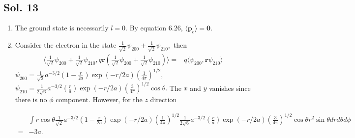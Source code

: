 \subsection*{Sol. 13}
\begin{enumerate}
    \item 
    The ground state is necessarily $l=0.$ By equation 6.26, $\langle \bm p_e\rangle=\bm 0.$
    \item Consider the electron in the state 
    $\frac{1}{\sqrt{2}}\psi_{200} +\frac{1}{\sqrt{2}} \psi_{210},$ then
    \begin{align*}
        \langle
        \frac{1}{\sqrt{2}}\psi_{200} +\frac{1}{\sqrt{2}} \psi_{210},
        q\bm r (\frac{1}{\sqrt{2}}\psi_{200} +\frac{1}{\sqrt{2}} \psi_{210})
        \rangle = & 
        q
        \langle\psi_{200}, \bm r\psi_{210}\rangle
    \end{align*}
    $\psi_{200}=\frac{1}{\sqrt{2}}a^{-3/2}(1-\frac{r}{2a})\exp(-r/2a)(\frac{1}{4\pi})^{1/2},$
    $\psi_{210}=\frac{1}{2\sqrt{6}}a^{-3/2}(\frac{r}{a})\exp(-r/2a)
    (\frac{3}{4\pi})^{1/2}\cos\theta.$
    The $x$ and $y$ vanishes since there is no $\phi$ component. However, for the $z$ direction
    
    \begin{align*}
        &\int
        r\cos\theta 
        \frac{1}{\sqrt{2}}a^{-3/2}(1-\frac{r}{2a})\exp(-r/2a)(\frac{1}{4\pi})^{1/2}
        \frac{1}{2\sqrt{6}}a^{-3/2}(\frac{r}{a})\exp(-r/2a)
    (\frac{3}{4\pi})^{1/2}\cos\theta r^2\sin\theta drd\theta d\phi\\
    =&-3a.
    \end{align*}
    
    
\end{enumerate}

